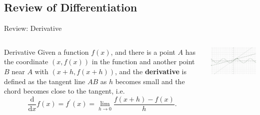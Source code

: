 \documentclass[10pt, aspectratio=1610]{beamer}
\begin{document}
\subsection{Review of Differentiation}
\begin{frame}{Review: Derivative}\vspace{4pt}
  \begin{columns}
    \begin{column}{0.5\textwidth}
      \begin{block}{Derivative}\vspace{0.5em}
        Given a function $f(x)$, and there is a point $A$ has the coordinate $(x, f(x))$ 
        in the function and another point $B$ near $A$ with $(x+h,f(x+h))$, and the \textbf{derivative}
        is defined as the tangent line $AB$ as $h$ becomes small and the chord becomes close
        to the tangent, i.e.
        \begin{equation*}\label{eq:1}
          \displaystyle \frac{\mathrm{d}}{\mathrm{d}x}f(x)= f^{\prime}(x)=\lim_{h \to 0} \frac{f(x+h)-f(x)}{h}.
        \end{equation*}
      \end{block}
    \end{column}

    \begin{column}{0.5\textwidth}
      \begin{center}
        \includegraphics[width=\textwidth]{derivative.png}
      \end{center}
    \end{column}
  \end{columns}
\end{frame} 
\end{document}
